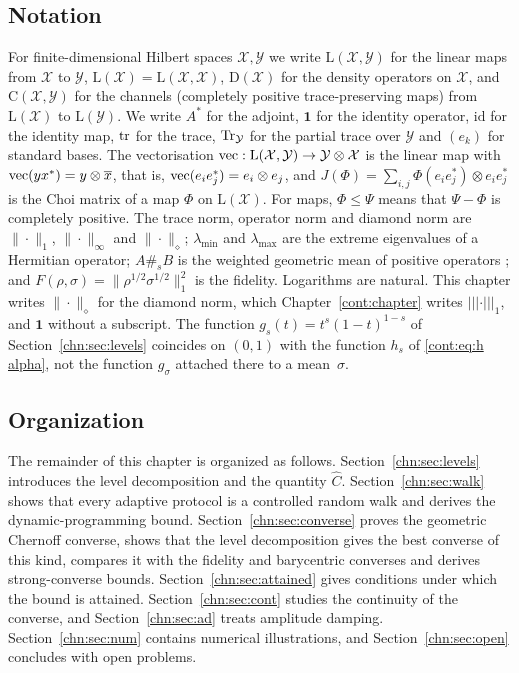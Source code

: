 \subsection{Notation}
For finite-dimensional Hilbert spaces $\mathcal X,\mathcal Y$ we write $\mathrm L(\mathcal X,\mathcal Y)$ for the linear maps from $\mathcal X$ to $\mathcal Y$, $\mathrm L(\mathcal X)=\mathrm L(\mathcal X,\mathcal X)$, $\mathrm D(\mathcal X)$ for the density operators on $\mathcal X$, and $\mathrm C(\mathcal X,\mathcal Y)$ for the channels (completely positive trace-preserving maps) from $\mathrm L(\mathcal X)$ to $\mathrm L(\mathcal Y)$. We write $A^*$ for the adjoint, $\mathbf 1$ for the identity operator, $\mathrm{id}$ for the identity map, $\operatorname{tr}$ for the trace, $\operatorname{Tr}_{\mathcal Y}$ for the partial trace over $\mathcal Y$ and $(e_k)$ for standard bases. The vectorisation $\operatorname{vec}:\mathrm L(\mathcal X,\mathcal Y)\to\mathcal Y\otimes\mathcal X$ is the linear map with $\operatorname{vec}(yx^*)=y\otimes\overline x$, that is, $\operatorname{vec}(e_ie_j^*)=e_i\otimes e_j$, and $J(\Phi)=\sum_{i,j}\Phi(e_ie_j^*)\otimes e_ie_j^*$ is the Choi matrix of a map $\Phi$ on $\mathrm L(\mathcal X)$. For maps, $\Phi\le\Psi$ means that $\Psi-\Phi$ is completely positive. The trace norm, operator norm and diamond norm are $\|\cdot\|_1$, $\|\cdot\|_\infty$ and $\|\cdot\|_\diamond$; $\lambda_{\min}$ and $\lambda_{\max}$ are the extreme eigenvalues of a Hermitian operator; $A\#_sB$ is the weighted geometric mean of positive operators \cite{KuboAndo1980}; and $F(\rho,\sigma)=\|\rho^{1/2}\sigma^{1/2}\|_1^2$ is the fidelity. Logarithms are natural.
This chapter writes $\|\cdot\|_\diamond$ for the diamond norm, which Chapter~\ref{cont:chapter} writes $|||\cdot|||_1$, and $\mathbf 1$ without a subscript. The function $g_s(t)=t^s(1-t)^{1-s}$ of Section~\ref{chn:sec:levels} coincides on $(0,1)$ with the function $h_s$ of \eqref{cont:eq:h alpha}, not the function $g_\sigma$ attached there to a mean~$\sigma$.

\subsection{Organization}
The remainder of this chapter is organized as follows. Section~\ref{chn:sec:levels} introduces the level decomposition and the quantity $\widehat C$. Section~\ref{chn:sec:walk} shows that every adaptive protocol is a controlled random walk and derives the dynamic-programming bound. Section~\ref{chn:sec:converse} proves the geometric Chernoff converse, shows that the level decomposition gives the best converse of this kind, compares it with the fidelity and barycentric converses and derives strong-converse bounds. Section~\ref{chn:sec:attained} gives conditions under which the bound is attained. Section~\ref{chn:sec:cont} studies the continuity of the converse, and Section~\ref{chn:sec:ad} treats amplitude damping. Section~\ref{chn:sec:num} contains numerical illustrations, and Section~\ref{chn:sec:open} concludes with open problems.

